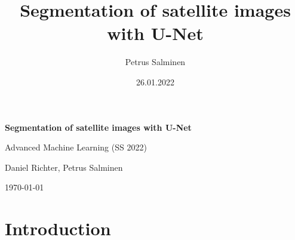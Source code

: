 \documentclass[12pt]{article}
\title{Segmentation of satellite images with U-Net}
\date{26.01.2022}
\author{Petrus Salminen}
\begin{document}
\begin{titlepage}
	\centering
	\vspace*{2.5cm}
	{\huge\bfseries Segmentation of satellite images with U-Net\par}
	\vspace{0.5cm}
	{\large Advanced Machine Learning (SS 2022)\par
	Daniel Richter, Petrus Salminen\par}
	\vfill
	{\large \today\par}
\end{titlepage}


\newpage
\tableofcontents
\newpage

\section{Introduction}
\end{document}
